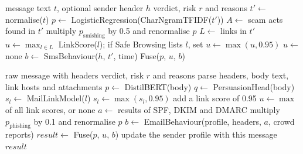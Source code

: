 {\begin{algorithm}[H]
\caption{Scoring one SMS}\label{alg:sms}
\begin{algorithmic}[1]
\REQUIRE message text $t$, optional sender header $h$
\ENSURE verdict, risk $r$ and reasons
\STATE $t' \leftarrow$ normalise($t$) 
\STATE $p \leftarrow$ LogisticRegression(CharNgramTFIDF($t'$)) 
\STATE $A \leftarrow$ scam acts found in $t'$ 
  \STATE multiply $p_{\text{smishing}}$ by 0.5 and renormalise $p$ 
\ENDIF
\STATE $L \leftarrow$ links in $t'$
  \STATE $u \leftarrow \max_{l \in L}$ LinkScore($l$); if Safe Browsing lists $l$, set $u \leftarrow \max(u, 0.95)$
\ELSE
  \STATE $u \leftarrow$ none
\ENDIF
\STATE $b \leftarrow$ SmsBehaviour($h$, $t'$, time) 
\STATE \RETURN Fuse($p$, $u$, $b$)
\end{algorithmic}
\end{algorithm}

\begin{algorithm}[H]
\caption{Scoring one email (Gmail path)}\label{alg:email}
\begin{algorithmic}[1]
\REQUIRE raw message with headers
\ENSURE verdict, risk $r$ and reasons
\STATE parse headers, body text, link hosts and attachments
\STATE $p \leftarrow$ DistilBERT(body) 
\STATE $q \leftarrow$ PersuasionHead(body) 
  \STATE $s_l \leftarrow$ MailLinkModel($l$) 
    \STATE $s_l \leftarrow \max(s_l, 0.95)$
  \ENDIF
\ENDFOR
{}
  \STATE add a link score of 0.95
\ENDFOR
\STATE $u \leftarrow \max$ of all link scores, or none
\STATE $a \leftarrow$ results of SPF, DKIM and DMARC
  \STATE multiply $p_{\text{phishing}}$ by 0.1 and renormalise $p$
\ENDIF
\STATE $b \leftarrow$ EmailBehaviour(profile, headers, $a$, crowd reports)
\STATE $result \leftarrow$ Fuse($p$, $u$, $b$)
\STATE update the sender profile with this message 
\STATE \RETURN $result$
\end{algorithmic}
\end{algorithm}

}
